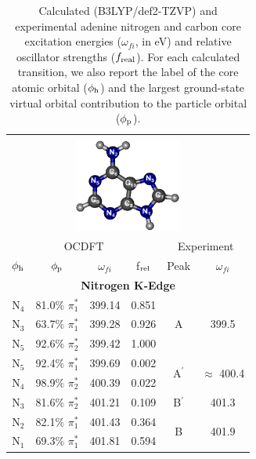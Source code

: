 \documentclass[12pt]{article}
\begin{document}
 \begin{table}[!ht]
 \footnotesize
\caption{Calculated (B3LYP/def2-TZVP) and experimental adenine nitrogen and carbon core excitation energies ($\omega_{fi}$, in eV) and relative oscillator strengths ($f_{\rm real}$).  For each calculated transition, we also report the label of the core atomic orbital ($\phi_{\rm h}$) and the  largest ground-state virtual orbital contribution to the particle orbital ($\phi_{\rm p}$).
}
 \centering
     \begin{tabular*}{8.5cm}{@{\extracolsep{\fill} }cccccc}
     \hline\hline\\[-8pt]
     \multicolumn{6}{c}{
 \includegraphics[width=3.5cm]{AdenineNumbering.png}}\\
     \hline
   \multicolumn{4}{c}{OCDFT} &\multicolumn{2}{c}{Experiment} \\
 $\phi_{\rm h}$ &  $\phi_{\rm p}$ & $\omega_{fi}$ & f$_{\rm rel}$ & Peak &  $\omega_{fi}$   \\[1pt]
   \hline
    \multicolumn{6}{c}{\textbf{Nitrogen K-Edge}} \vspace{0.05in}\\
    N$_4$
 &   81.0$\%$ $\pi_1^*$  & 399.14 & 0.851 & \multirow{3}{*}{A} & \multirow{3}{*}{399.5} \\
    N$_3$
 &   63.7$\%$ $\pi_1^*$  & 399.28 & 0.926 \\
    N$_5$
 &   92.6$\%$ $\pi_2^*$  & 399.42 & 1.000 
\vspace{0.05in}\\
    N$_5$
 &   92.4$\%$ $\pi_1^*$  & 399.69 & 0.002 & \multirow{2}{*}{A$^{\prime}$} & \multirow{2}{*}{$\approx$ 400.4}  \\
    N$_4$
 &   98.9$\%$ $\pi_2^*$
 & 400.39 & 0.022 
 \vspace{0.05in}\\
    N$_3$
 &   81.6$\%$ $\pi_2^*$  & 401.21 & 0.109 & B$^{\prime}$ & 401.3 
 \vspace{0.05in}\\
    N$_2$
 &   82.1$\%$ $\pi_1^*$  & 401.43 & 0.364 & \multirow{3}{*}{B} & \multirow{3}{*}{401.9}\\
    N$_1$
 &   69.3$\%$ $\pi_1^*$  & 401.81 & 0.594 \\

\end{tabular*}
\end{table}
\end{document}
